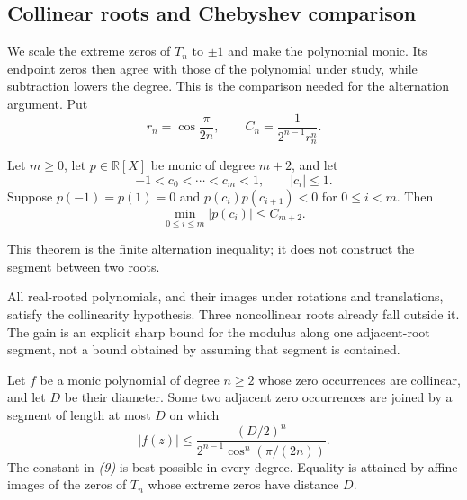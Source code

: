 \documentclass[11pt]{article}
\begin{document}
\subsection{Collinear roots and Chebyshev comparison}
\label{subsec:sharp-collinear-chebyshev}

We scale the extreme zeros of $T_n$ to $\pm1$ and make the polynomial
monic. Its endpoint zeros then agree with those of the polynomial under
study, while subtraction lowers the degree. This is the comparison
needed for the alternation argument. Put
\[
 r_n=\cos\frac{\pi}{2n},
 \qquad C_n=\frac{1}{2^{n-1}r_n^n}.
\]

\begin{theorem}
\label{prop:sharp-collinear-chebyshev-comparator}
Let $m\ge0$, let $p\in\mathbb R[X]$ be monic of degree $m+2$, and let
\[
 -1<c_0<\cdots<c_m<1,\qquad |c_i|\le1.
\]
Suppose $p(-1)=p(1)=0$ and
$p(c_i)p(c_{i+1})<0$ for $0\le i<m$.  Then
\[
 \min_{0\le i\le m}|p(c_i)|\le C_{m+2}.
\]
\end{theorem}

This theorem is the finite alternation inequality; it does not construct
the segment between two roots.

All real-rooted polynomials, and their images under rotations and
translations, satisfy the collinearity hypothesis. Three noncollinear
roots already fall outside it. The gain is an explicit sharp bound for
the modulus along one adjacent-root segment, not a bound obtained by
assuming that segment is contained.

\begin{theorem}
\label{thm:sharp-collinear-diameter}
Let $f$ be a monic polynomial of degree $n\ge2$ whose zero occurrences are
collinear, and let $D$ be their diameter.  Some two adjacent zero occurrences
are joined by a segment of length at most $D$ on which
\[
 |f(z)|\le
 \frac{(D/2)^n}{2^{n-1}\cos^n(\pi/(2n))}.          \tag{9}
\]
The constant in \emph{(9)} is best possible in every degree.  Equality is
attained by affine images of the zeros of $T_n$ whose extreme zeros have
distance $D$.
\end{theorem}
\end{document}
